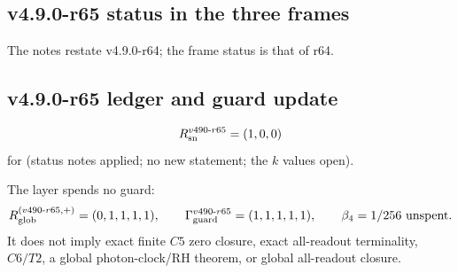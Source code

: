 \subsection*{v4.9.0-r65 status in the three frames}
\label{subsec:v490-r65-frames}

The notes restate v4.9.0-r64; the frame status is that of r64.

\subsection*{v4.9.0-r65 ledger and guard update}
\label{subsec:v490-r65-ledger-guard}

\[
R_{\rm sn}^{v490\text{-}r65}=(1,0,0)
\]
for (status notes applied; no new statement; the \(k\) values open).

The layer spends no guard:
\[
R_{\rm glob}^{(v490\text{-}r65,+)}=(0,1,1,1,1),
\qquad
\Gamma_{\rm guard}^{v490\text{-}r65}=(1,1,1,1,1),
\qquad
\beta_4=1/256\ \text{unspent}.
\]
It does not imply exact finite \(C5\) zero closure, exact all-readout terminality,
\(C6/T2\), a global photon-clock/RH theorem, or global all-readout closure.
